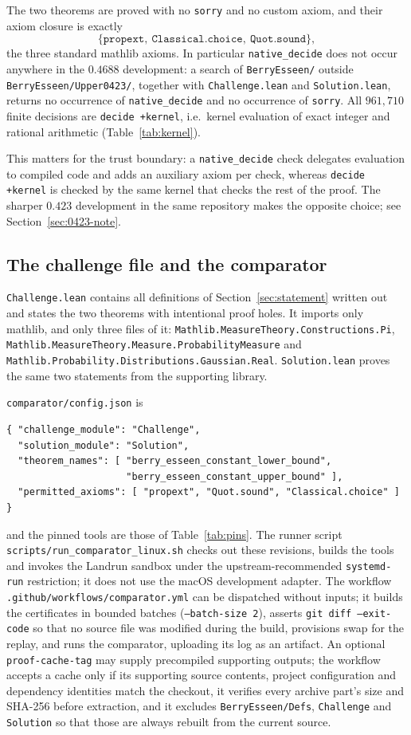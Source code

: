 \documentclass[10pt,a4paper]{article}
\theoremstyle{plain}
\theoremstyle{definition}
\newcommand{\lean}[1]{\texttt{#1}}
\newcommand{\file}[1]{\texttt{#1}}
\begin{document}
The two theorems are proved with no \lean{sorry} and no custom axiom, and their
axiom closure is exactly
\[
  \{\lean{propext},\ \lean{Classical.choice},\ \lean{Quot.sound}\},
\]
the three standard mathlib axioms. In particular \lean{native\_decide} does not
occur anywhere in the $0.4688$ development: a search of
\file{BerryEsseen/} outside \file{BerryEsseen/Upper0423/}, together with
\file{Challenge.lean} and \file{Solution.lean}, returns no occurrence of
\lean{native\_decide} and no occurrence of \lean{sorry}. All $961{,}710$ finite
decisions are \lean{decide +kernel}, i.e.\ kernel evaluation of exact integer and
rational arithmetic (Table~\ref{tab:kernel}).

This matters for the trust boundary: a \lean{native\_decide} check delegates
evaluation to compiled code and adds an auxiliary axiom per check, whereas
\lean{decide +kernel} is checked by the same kernel that checks the rest of the
proof. The sharper $0.423$ development in the same repository makes the opposite
choice; see Section~\ref{sec:0423-note}.

\subsection{The challenge file and the comparator}

\file{Challenge.lean} contains all definitions of Section~\ref{sec:statement}
written out and states the two theorems with intentional proof holes. It
imports only mathlib, and only three files of it:
\file{Mathlib.MeasureTheory.Constructions.Pi},
\file{Mathlib.MeasureTheory.Measure.ProbabilityMeasure} and
\file{Mathlib.Probability.Distributions.Gaussian.Real}. \file{Solution.lean} proves the same two
statements from the supporting library.

\file{comparator/config.json} is
\begin{verbatim}
{ "challenge_module": "Challenge",
  "solution_module": "Solution",
  "theorem_names": [ "berry_esseen_constant_lower_bound",
                     "berry_esseen_constant_upper_bound" ],
  "permitted_axioms": [ "propext", "Quot.sound", "Classical.choice" ] }
\end{verbatim}
and the pinned tools are those of Table~\ref{tab:pins}. The runner script
\file{scripts/run\_comparator\_linux.sh} checks out these revisions, builds the
tools and invokes the Landrun sandbox under the upstream-recommended
\texttt{systemd-run} restriction; it does not use the macOS development
adapter. The workflow \file{.github/workflows/comparator.yml} can be dispatched
without inputs; it builds the certificates in bounded batches
(\texttt{--batch-size 2}), asserts \texttt{git diff --exit-code} so that no
source file was modified during the build, provisions swap for the replay, and
runs the comparator, uploading its log as an artifact. An optional
\texttt{proof-cache-tag} may supply precompiled supporting outputs; the workflow
accepts a cache only if its supporting source contents, project configuration
and dependency identities match the checkout, it verifies every archive part's
size and SHA-256 before extraction, and it excludes
\file{BerryEsseen/Defs}, \file{Challenge} and \file{Solution} so that those are
always rebuilt from the current source.
\end{document}
